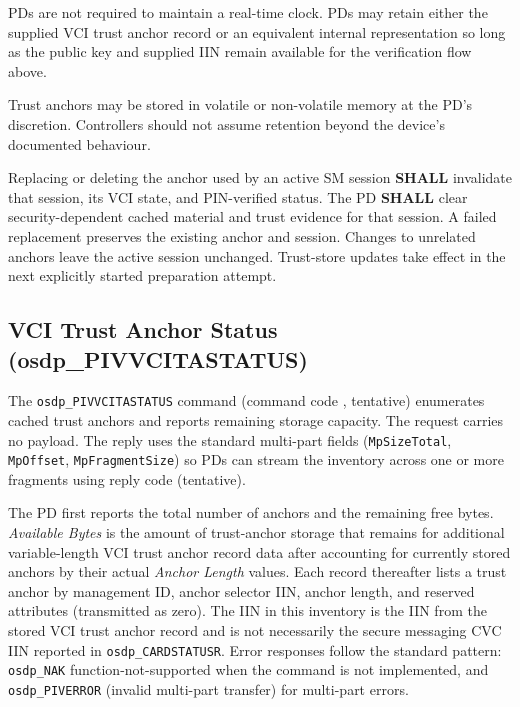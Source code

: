 PDs are not required to maintain a real-time clock. PDs may retain either the supplied VCI trust anchor record or an equivalent internal representation so long as the public key and supplied IIN remain available for the verification flow above.

Trust anchors may be stored in volatile or non-volatile memory at the PD’s discretion. Controllers should not assume retention beyond the device’s documented behaviour.

Replacing or deleting the anchor used by an active SM session \textbf{SHALL}
invalidate that session, its VCI state, and PIN-verified status. The PD
\textbf{SHALL} clear security-dependent cached material and trust evidence for
that session. A failed replacement preserves the existing anchor and session.
Changes to unrelated anchors leave the active session unchanged. Trust-store
updates take effect in the next explicitly started preparation attempt.

\subsection{VCI Trust Anchor Status (osdp\_PIVVCITASTATUS)}

The \texttt{osdp\_PIVVCITASTATUS} command (command code , tentative) enumerates cached trust anchors and reports remaining storage capacity. The request carries no payload. The reply uses the standard multi-part fields (\texttt{MpSizeTotal}, \texttt{MpOffset}, \texttt{MpFragmentSize}) so PDs can stream the inventory across one or more fragments using reply code  (tentative).





The PD first reports the total number of anchors and the remaining free bytes. \emph{Available Bytes} is the amount of trust-anchor storage that remains for additional variable-length VCI trust anchor record data after accounting for currently stored anchors by their actual \emph{Anchor Length} values. Each record thereafter lists a trust anchor by management ID, anchor selector IIN, anchor length, and reserved attributes (transmitted as zero). The IIN in this inventory is the IIN from the stored VCI trust anchor record and is not necessarily the secure messaging CVC IIN reported in \texttt{osdp\_CARDSTATUSR}. Error responses follow the standard pattern: \texttt{osdp\_NAK} function-not-supported when the command is not implemented, and \texttt{osdp\_PIVERROR}  (invalid multi-part transfer) for multi-part errors.


